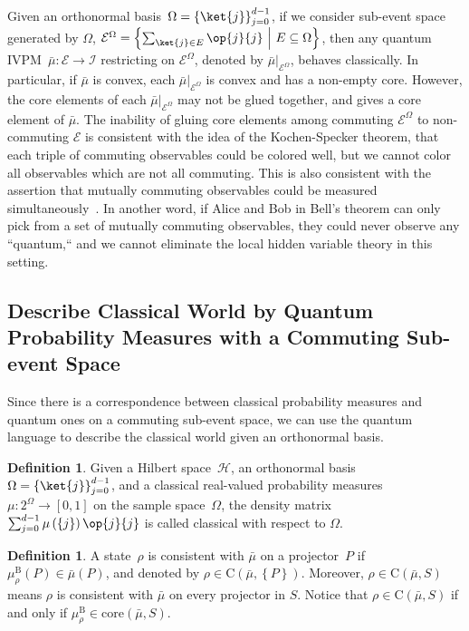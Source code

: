 \documentclass[12pt]{iopart}
\theoremstyle{plain}
\theoremstyle{definition}
\newtheorem{definition}[thm]{Definition}
\theoremstyle{remark}
\newcommand{\Hilb}{\mathcal{H}}
\newcommand{\events}{\ensuremath{\mathcal{E}}}
\newcommand{\pmeas}{\ensuremath{\mu}}
\newcommand{\proj}[1]{\op{#1}{#1}}
\newcommand{\set}[2]{\ensuremath{\left\{ {#1}~\middle|~{#2}\right\} }}
\newcommand{\coreBorn}{\ensuremath{\mathrm{C}}}
\begin{document}
Given an orthonormal basis~$\Omega=\left\{ \ket{j}\right\} _{j=0}^{d-1}$,
if we consider sub-event space generated by $\Omega$, $\events^{\Omega}=\set{\sum_{\ket{j}\in E}\proj{j}}{E\subseteq\Omega}$,
then any quantum IVPM~$\bar{\mu}:\events\rightarrow\mathscr{I}$
restricting on $\events^{\Omega}$, denoted by $\bar{\mu}|_{\events^{\Omega}}$,
behaves classically. In particular, if $\bar{\mu}$ is convex, each
$\bar{\mu}|_{\events^{\Omega}}$ is convex and has a non-empty core.
However, the core elements of each $\bar{\mu}|_{\events^{\Omega}}$
may not be glued together, and gives a core element of $\bar{\mu}$.
The inability of gluing core elements among commuting $\events^{\Omega}$
to non-commuting $\events$ is consistent with the idea of the Kochen-Specker
theorem, that each triple of commuting observables could be colored
well, but we cannot color all observables which are not all commuting.
This is also consistent with the assertion that mutually commuting
observables could be measured simultaneously~\cite{Mermin_1993}.
In another word, if Alice and Bob in Bell's theorem can only pick
from a set of mutually commuting observables, they could never observe
any ``quantum,`` and we cannot eliminate the local hidden variable
theory in this setting.

\subsection{Describe Classical World by Quantum Probability Measures with a Commuting
Sub-event Space}

Since there is a correspondence between classical probability measures
and quantum ones on a commuting sub-event space, we can use the quantum
language to describe the classical world given an orthonormal basis.

\begin{definition}Given a Hilbert space~$\Hilb$, an orthonormal
basis~$\Omega=\left\{ \ket{j}\right\} _{j=0}^{d-1}$, and a classical
real-valued probability measures~$\pmeas:2^{\Omega}\rightarrow\left[0,1\right]$
on the sample space~$\Omega$, the density matrix~$\sum_{j=0}^{d-1}\pmeas\left(\left\{ j\right\} \right)\proj{j}$
is called classical with respect to $\Omega$.\end{definition}

\begin{definition}\label{def:consistent-state}A state~$\rho$ is
consistent with $\bar{\mu}$ on a projector~$P$ if $\mu_{\rho}^{\mathrm{B}}\left(P\right)\in\bar{\mu}\left(P\right)$,
and denoted by $\rho\in\coreBorn\left(\bar{\mu},\left\{ P\right\} \right)$.
Moreover, $\rho\in\coreBorn\left(\bar{\mu},S\right)$ means $\rho$
is consistent with $\bar{\mu}$ on every projector in $S$. Notice
that $\rho\in\coreBorn\left(\bar{\mu},S\right)$ if and only if $\mu_{\rho}^{\mathrm{B}}\in\mathrm{core}\left(\bar{\mu},S\right)$.\end{definition}
\end{document}

